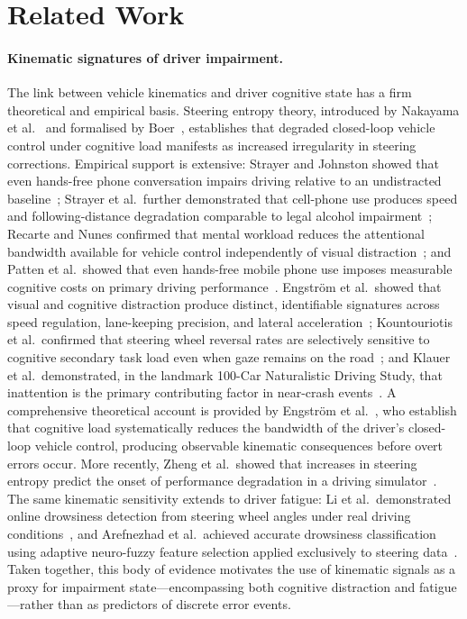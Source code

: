 \section{Related Work}
\label{sec:related}

\paragraph{Kinematic signatures of driver impairment.}
The link between vehicle kinematics and driver cognitive state has a firm theoretical and empirical basis.
Steering entropy theory, introduced by Nakayama et al.~\cite{Nakayama1999} and formalised by Boer~\cite{Boer2000},
establishes that degraded closed-loop vehicle control under cognitive load manifests as increased irregularity
in steering corrections.
Empirical support is extensive: Strayer and Johnston showed that even hands-free phone conversation
impairs driving relative to an undistracted baseline~\cite{Strayer2001};
Strayer et al.\ further demonstrated that cell-phone use produces speed and following-distance
degradation comparable to legal alcohol impairment~\cite{Strayer2003,Strayer2006};
Recarte and Nunes confirmed that mental workload reduces the attentional bandwidth available for
vehicle control independently of visual distraction~\cite{Recarte2003};
and Patten et al.\ showed that even hands-free mobile phone use imposes measurable cognitive
costs on primary driving performance~\cite{Patten2004}.
Engstr\"{o}m et al.\ showed that visual and cognitive distraction produce distinct, identifiable
signatures across speed regulation, lane-keeping precision, and lateral acceleration~\cite{Engstrom2005};
Kountouriotis et al.\ confirmed that steering wheel reversal rates are selectively sensitive
to cognitive secondary task load even when gaze remains on the road~\cite{Kountouriotis2016};
and Klauer et al.\ demonstrated, in the landmark 100-Car Naturalistic Driving Study, that
inattention is the primary contributing factor in near-crash events~\cite{Klauer2006}.
A comprehensive theoretical account is provided by Engstr\"{o}m et al.~\cite{Engstrom2017},
who establish that cognitive load systematically reduces the bandwidth of the driver's
closed-loop vehicle control, producing observable kinematic consequences before overt errors occur.
More recently, Zheng et al.\ showed that increases in steering entropy predict the onset of performance
degradation in a driving simulator~\cite{Zheng2022}.
The same kinematic sensitivity extends to driver fatigue: Li et al.\ demonstrated online drowsiness
detection from steering wheel angles under real driving conditions~\cite{LiFatigue2017},
and Arefnezhad et al.\ achieved accurate drowsiness classification using adaptive neuro-fuzzy
feature selection applied exclusively to steering data~\cite{Arefnezhad2019}.
Taken together, this body of evidence motivates the use of kinematic signals as a proxy
for impairment state---encompassing both cognitive distraction and fatigue---rather than
as predictors of discrete error events.

